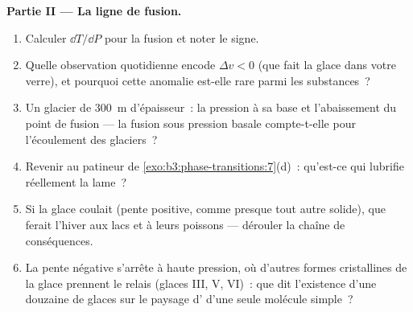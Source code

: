 \begin{problem}
\medskip\noindent\textbf{Partie II --- La ligne de fusion.}
\begin{enumerate}[resume]
  \item Calculer $\dd T/\dd P$ pour la fusion et noter le signe.
  \item Quelle observation quotidienne encode $\Delta v < 0$ (que
        fait la glace dans votre verre), et pourquoi cette anomalie
        est-elle rare parmi les substances~?
  \item Un glacier de \qty{300}{m} d'épaisseur~: la pression à sa
        base et l'abaissement du point de fusion --- la fusion sous
        pression basale compte-t-elle pour l'écoulement des
        glaciers~?
  \item Revenir au patineur de
        \cref{exo:b3:phase-transitions:7}(d)~: qu'est-ce qui
        lubrifie réellement la lame~?
  \item Si la glace coulait (pente positive, comme presque tout
        autre solide), que ferait l'hiver aux lacs et à leurs
        poissons --- dérouler la chaîne de conséquences.
  \item La pente négative s'arrête à haute pression, où d'autres
        formes cristallines de la glace prennent le relais (glaces
        III, V, VI)~: que dit l'existence d'une douzaine de glaces
        sur le paysage d' d'une seule molécule
        simple~?
\end{enumerate}


\end{problem}
